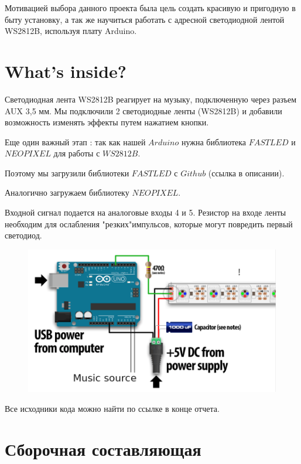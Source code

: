 \documentclass[a4paper, 12pt]{article}%
\begin{document}
Мотивацией выбора данного проекта была цель создать красивую и пригодную в быту установку, а так же научиться работать с адресной светодиодной лентой WS2812B, используя плату Arduino.


\section{What's inside?}

Светодиодная лента WS2812B реагирует на музыку, подключенную через разъем AUX 3,5 мм. Мы подключили 2 светодиодные ленты (WS2812B) и добавили возможность изменять эффекты путем нажатием кнопки.


Еще один важный этап : так как нашей $Arduino$ нужна библиотека $FAST LED$ и $NEOPIXEL$ для работы с $WS2812B$.

Поэтому мы загрузили библиотеки $FAST LED$ с $Github$ (ссылка в описании).

Аналогично загружаем библиотеку $NEOPIXEL$. 

Входной сигнал подается на аналоговые входы 4 и 5. Резистор на входе ленты необходим для ослабления "резких"импульсов, которые могут повредить первый светодиод.

\begin{figure}[!h]
\begin{center}
\includegraphics[scale=0.5]{scheme.png}
\end{center}
\end{figure}

Все исходники кода можно найти по ссылке в конце отчета.

\section{Сборочная составляющая}
\end{document}
